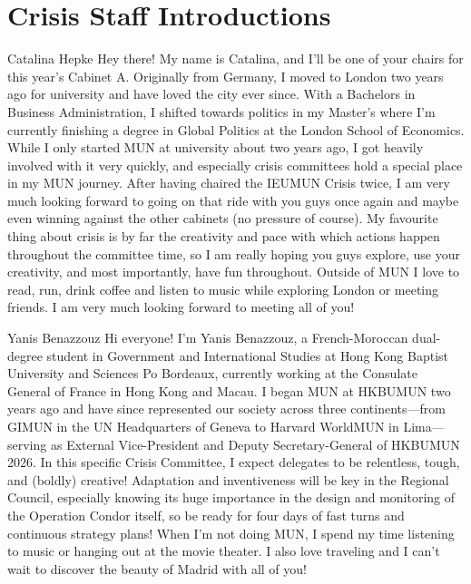 \section{Crisis Staff Introductions}

\begin{chairletter}[Chair]{Catalina Hepke}
Hey there! My name is Catalina, and I’ll be one of your chairs for this year’s Cabinet A. Originally from Germany, I moved to London two years ago for university and have loved the city ever since. With a Bachelors in Business Administration, I shifted towards politics in my Master's where I’m currently finishing a degree in Global Politics at the London School of Economics. While I only started MUN at university about two years ago, I got heavily involved with it very quickly, and especially crisis committees hold a special place in my MUN journey. After having chaired the IEUMUN Crisis twice, I am very much looking forward to going on that ride with you guys once again and maybe even winning against the other cabinets (no pressure of course). My favourite thing about crisis is by far the creativity and pace with which actions happen throughout the committee time, so I am really hoping you guys explore, use your creativity, and most importantly, have fun throughout. Outside of MUN I love to read, run, drink coffee and listen to music while exploring London or meeting friends. I am very much looking forward to meeting all of you!

\end{chairletter}

\begin{chairletter}[Co-Chair]{Yanis Benazzouz}
Hi everyone! I’m Yanis Benazzouz, a French-Moroccan dual-degree student in Government and International Studies at Hong Kong Baptist University and Sciences Po Bordeaux, currently working at the Consulate General of France in Hong Kong and Macau. I began MUN at HKBUMUN two years ago and have since represented our society across three continents—from GIMUN in the UN Headquarters of Geneva to Harvard WorldMUN in Lima—serving as External Vice-President and Deputy Secretary-General of HKBUMUN 2026. In this specific Crisis Committee, I expect delegates to be relentless, tough, and (boldly) creative! Adaptation and inventiveness will be key in the Regional Council, especially knowing its huge importance in the design and monitoring of the Operation Condor itself, so be ready for four days of fast turns and continuous strategy plans! When I'm not doing MUN, I spend my time listening to music or hanging out at the movie theater. I also love traveling and I can’t wait to discover the beauty of Madrid with all of you!

\end{chairletter}

